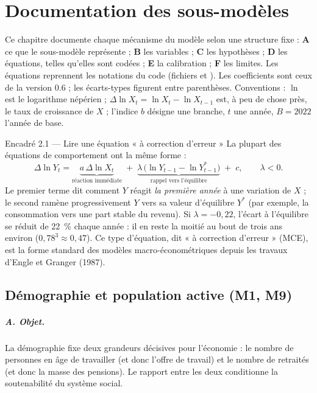 \chapter{Documentation des sous-modèles}
\label{ch:sousmodeles}

Ce chapitre documente chaque mécanisme du modèle selon une structure fixe : \textbf{A} ce que le sous-modèle
représente ; \textbf{B} les variables ; \textbf{C} les hypothèses ; \textbf{D} les équations, telles qu'elles sont
codées ; \textbf{E} la calibration ; \textbf{F} les limites. Les équations reprennent les notations du code
(fichiers  et ). Les coefficients sont ceux de la version 0.6 ;
les écarts-types figurent entre parenthèses. Conventions : $\ln$ est le logarithme népérien ; $\Delta \ln X_t =
\ln X_t - \ln X_{t-1}$ est, à peu de chose près, le taux de croissance de $X$ ; l'indice $b$ désigne une branche,
$t$ une année, $B = 2022$ l'année de base.

\begin{encadre}{Encadré 2.1 — Lire une équation « à correction d'erreur »}
La plupart des équations de comportement ont la même forme :
\[
\Delta \ln Y_t = \underbrace{a\,\Delta \ln X_t}_{\text{réaction immédiate}}
\;+\; \underbrace{\lambda\,\bigl(\ln Y_{t-1} - \ln Y^{*}_{t-1}\bigr)}_{\text{rappel vers l'équilibre}} \;+\; c ,
\qquad \lambda < 0 .
\]
Le premier terme dit comment $Y$ réagit \emph{la première année} à une variation de $X$ ; le second ramène
progressivement $Y$ vers sa valeur d'équilibre $Y^{*}$ (par exemple, la consommation vers une part stable du revenu).
Si $\lambda = -0{,}22$, l'écart à l'équilibre se réduit de 22~\% chaque année : il en reste la moitié au bout de
trois ans environ ($0{,}78^3 \approx 0{,}47$). Ce type d'équation, dit « à correction d'erreur » (MCE), est la forme
standard des modèles macro-économétriques depuis les travaux d'Engle et Granger (1987).
\end{encadre}

\section{Démographie et population active (M1, M9)}
\label{sec:m1}

\paragraph{A. Objet.} La démographie fixe deux grandeurs décisives pour l'économie : le nombre de personnes en âge
de travailler (et donc l'offre de travail) et le nombre de retraités (et donc la masse des pensions). Le rapport entre
les deux conditionne la soutenabilité du système social.

